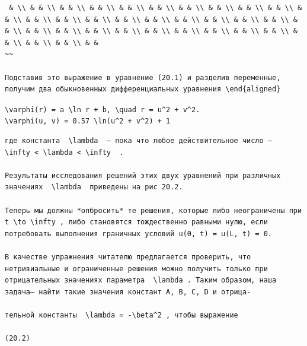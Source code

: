 \documentclass[
  ukrainian,
]{article}
\begin{document}
\begin{verbatim}
 & \\ & & \\ & & \\ & & \\ & & \\ & & \\ & & \\ & & \\ & & \\ & & \\ & & \\ & & \\ & & \\ & & \\ & & \\ & & \\ & & \\ & & \\ & & \\ & & \\ & & \\ & & \\ & & \\ & & \\ & & \\ & & \\ & & \\ & & \\ & & \\ & & \\ & & \\ & & \\ & & \\ & &
~~

Подставив это выражение в уравнение (20.1) и разделив переменные, получим два обыкновенных дифференциальных уравнения \end{aligned}
\end{verbatim}

\texttt{\textbackslash{}varphi(r)\ =\ a\ \textbackslash{}ln\ r\ +\ b,\ \textbackslash{}quad\ r\ =\ u\^{}2\ +\ v\^{}2.}
\texttt{\textbackslash{}varphi(u,\ v)\ =\ 0.57\ \textbackslash{}ln(u\^{}2\ +\ v\^{}2)\ +\ 1}

\begin{verbatim}
где константа  \lambda  — пока что любое действительное число —  \infty < \lambda < \infty  .

Результаты исследования решений этих двух уравнений при различных значениях  \lambda  приведены на рис 20.2.

Теперь мы должны *опбросить* те решения, которые либо неограничены при  t \to \infty , либо становятся тождественно равными нулю, если потребовать выполнения граничных условий u(0, t) = u(L, t) = 0.

В качестве упражнения читателю предлагается проверить, что нетривиальные и ограниченные решения можно получить только при отрицательных значениях параметра  \lambda . Таким образом, наша задача— найти такие значения констант A, B, C, D и отрица-

тельной константы  \lambda = -\beta^2 , чтобы выражение

(20.2)
\end{verbatim}
\end{document}
